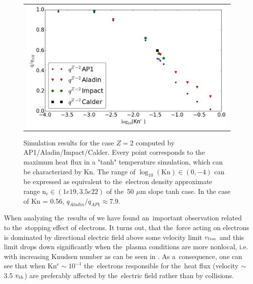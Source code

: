 \begin{figure}[tbh]
  \begin{center}
    \begin{tabular}{c}
      \includegraphics[width=\figscale\textwidth]{Kn_results.png}
    \end{tabular}
  \caption{  
  Simulation results for the case $Z=2$ computed by AP1/Aladin/Impact/Calder.
  Every point corresponds to the maximum heat flux in a "tanh" temperature 
  simulation, which can be characterized by Kn. The range of 
  $\log_{10}(\text{Kn})\in (0, -4)$ can be expressed as equivalent 
  to the~electron density approximate range n$_e \in (1e19, 3.5e22)$ of 
  the~50 $\mu$m slope tanh case. In the case of Kn = 0.56, 
  $q_{Aladin} / q_{AP1}\approx 7.9$.}
  \label{fig:Kn_results}
  \end{center} 
\end{figure}
When analyzing the~results of  we have found 
an~important observation related to the~stopping effect of electrons.
It turns out, that the~force acting on electrons is dominated by directional
electric field above some velocity limit $v_{lim}$ and this limit drops 
down significantly when the~plasma conditions are more nonlocal, 
i.e. with increasing Knudsen number as can be seen in . 
As a~consequence, one can see
that when Kn$^{e} \sim 10^{-1}$ the~electrons responsible for the~heat flux
(velocity $\sim$ 3.5 $v_{th}$) are preferably affected by the~electric field
rather than by collisions.

